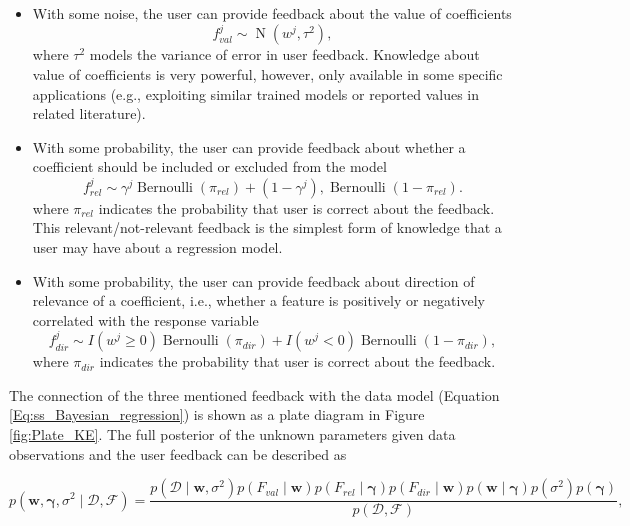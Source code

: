\documentclass[dissertation,math,vertlayout,pdfa,colorlinks]{aaltoseries}
\newcommand{\bw}{\bm{w}}
\newcommand{\bD}{\mathcal{D}}
\newcommand{\bF}{\mathcal{F}}
\DeclareMathOperator{\bernoullipdf}{Bernoulli}
\DeclareMathOperator{\normalpdf}{N}
\begin{document}
\begin{itemize}
	\item With some noise, the user can provide feedback about the value of coefficients
	\begin{equation}\label{Eq:fb_on_val_coeff}
	f_{val}^{j} \sim \normalpdf(w^j, \tau^2),
	\end{equation}
	\noindent where $\tau^2$ models the variance of error in user feedback. Knowledge about value of coefficients is very powerful, however, only available in some specific applications (e.g., exploiting similar trained models or reported values in related literature). 
	\item With some probability, the user can provide feedback about whether a coefficient should be included or excluded from the model
	\begin{equation}\label{Eq:fb_on_rel_coeff}
	f_{rel}^{j} \sim \gamma^j \bernoullipdf(\pi_{rel}) + (1 - \gamma^j), \bernoullipdf(1 - \pi_{rel}).
	\end{equation}
	\noindent where $\pi_{rel}$ indicates the probability that user is correct about the feedback. This relevant/not-relevant feedback is the simplest form of knowledge that a user may have about a regression model. 
	\item With some probability, the user can provide feedback about direction of relevance of a coefficient, i.e., whether a feature is positively or negatively correlated with the response variable
	\begin{equation}\label{Eq:fb_on_dir_coeff}
	f_{dir}^{j} \sim I(w^j \geq 0) \bernoullipdf(\pi_{dir}) + I(w^j < 0) \bernoullipdf(1 - \pi_{dir}),
	\end{equation}
	\noindent where $\pi_{dir}$ indicates the probability that user is correct about the feedback.
\end{itemize}



The connection of the three mentioned feedback with the data model (Equation \ref{Eq:ss_Bayesian_regression}) is shown as a plate diagram in Figure \ref{fig:Plate_KE}. The full posterior of the unknown parameters given data observations and the user feedback can be described as 

\begin{equation}\label{Eq:Bayes_rule_ss_reg_with_fb}
p(\bw, \bm{\gamma}, \sigma^2 \mid \bD,\bF) = \frac{p(\bD \mid \bw, \sigma^2)p(F_{val} \mid \bw)p(F_{rel} \mid \bm{\gamma})p(F_{dir} \mid \bw)p(\bw \mid \bm{\gamma})p(\sigma^2)p(\bm{\gamma})}{p(\bD,\bF)},
\end{equation} 
\end{document}
